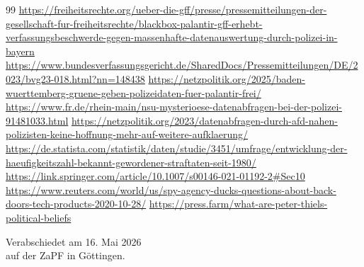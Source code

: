 \documentclass[DIV=calc]{scrartcl}
\begin{document}
\begin{thebibliography}{99}
     \url{https://freiheitsrechte.org/ueber-die-gff/presse/pressemitteilungen-der-gesellschaft-fur-freiheitsrechte/blackbox-palantir-gff-erhebt-verfassungsbeschwerde-gegen-massenhafte-datenauswertung-durch-polizei-in-bayern}
     \url{https://www.bundesverfassungsgericht.de/SharedDocs/Pressemitteilungen/DE/2023/bvg23-018.html?nn=148438}
     \url{https://netzpolitik.org/2025/baden-wuerttemberg-gruene-geben-polizeidaten-fuer-palantir-frei/}
     \url{https://www.fr.de/rhein-main/nsu-mysterioese-datenabfragen-bei-der-polizei-91481033.html}
     \url{https://netzpolitik.org/2023/datenabfragen-durch-afd-nahen-polizisten-keine-hoffnung-mehr-auf-weitere-aufklaerung/}
     \url{https://de.statista.com/statistik/daten/studie/3451/umfrage/entwicklung-der-haeufigkeitszahl-bekannt-gewordener-straftaten-seit-1980/}
     \url{https://link.springer.com/article/10.1007/s00146-021-01192-2#Sec10}
     \url{https://www.reuters.com/world/us/spy-agency-ducks-questions-about-back-doors-tech-products-2020-10-28/}
     \url{https://press.farm/what-are-peter-thiels-political-beliefs}
\end{thebibliography}




\vspace{1cm} 
%
\vfill
\begin{flushright}
	Verabschiedet am 16. Mai 2026 \\
	auf der ZaPF in Göttingen.
\end{flushright}
\end{document}
